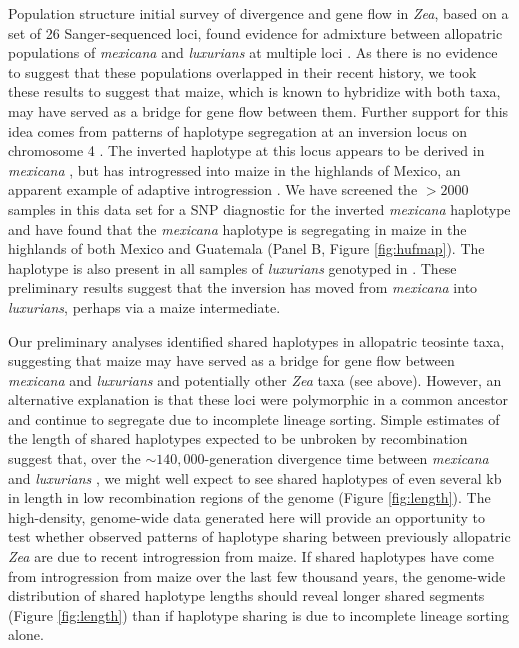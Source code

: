Population structure  initial survey of divergence and gene flow in \emph{Zea}, based on a set of 26 Sanger-sequenced loci, found evidence for admixture between allopatric populations of \emph{mexicana} and \emph{luxurians} at multiple loci \citep{Ross-Ibarra2009a}. 
As there is no evidence to suggest that these populations overlapped in their recent history, we took these results to suggest that maize, which is known to hybridize with both taxa, may have served as a bridge for gene flow between them.
Further support for this idea comes from patterns of haplotype segregation at an inversion locus on chromosome 4 \citep[\emph{Inv4m};][]{Fang2012,Pyhajarvi2013,Hufford2013}. 
The inverted haplotype at this locus appears to be derived in \emph{mexicana} \citep{Pyhajarvi2013}, but has introgressed into maize in the highlands of Mexico, an apparent example of adaptive introgression \citep[Panel A, Figure \ref{fig:hufmap};][]{Hufford2013}.
We have screened the $>2000$ samples in this data set for a SNP diagnostic for the inverted \emph{mexicana} haplotype and have found that the \emph{mexicana} haplotype is segregating in maize in the highlands of both Mexico and Guatemala (Panel B, Figure \ref{fig:hufmap}).  The haplotype is also present in all samples of \emph{luxurians} genotyped in \citet{Fang2012}.
These preliminary results suggest that the inversion has moved from \emph{mexicana} into \emph{luxurians}, perhaps via a maize intermediate.




Our preliminary analyses identified shared haplotypes in allopatric teosinte taxa, suggesting that maize may have served as a bridge for gene flow between \emph{mexicana} and \emph{luxurians} and potentially other \emph{Zea} taxa (see above).  However, an alternative explanation is that these loci were polymorphic in a common ancestor and continue to segregate due to incomplete lineage sorting.
Simple estimates of the length of shared haplotypes expected to be unbroken by recombination suggest that, over the $\sim 140,000$-generation divergence time between \emph{mexicana} and \emph{luxurians} \citep{Ross-Ibarra2009a}, we might well expect to see shared haplotypes of even several kb in length in low recombination regions of the genome (Figure \ref{fig:length}).
The high-density, genome-wide data generated here will provide an opportunity to test whether observed patterns of haplotype sharing between previously allopatric \emph{Zea} are due to recent introgression from maize.  
If shared haplotypes have come from introgression from maize over the last few thousand years, the genome-wide distribution of shared haplotype lengths should reveal longer shared segments (Figure \ref{fig:length}) than if haplotype sharing is due to incomplete lineage sorting alone.

